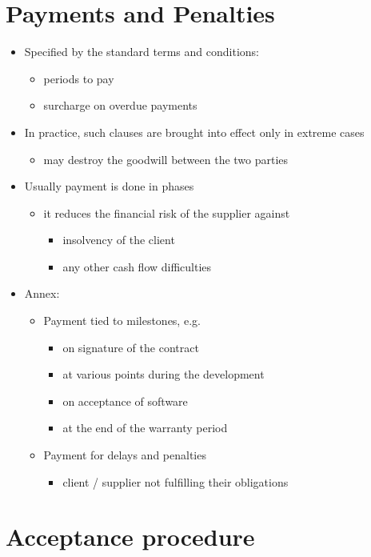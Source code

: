 \documentclass{article}
\begin{document}
\section{Payments and Penalties}
\begin{itemize}
\item Specified by the standard terms and conditions:
\begin{itemize}
\item periods to pay
\item surcharge on overdue payments
\end{itemize}
\item In practice, such clauses are brought into effect only in extreme cases
\begin{itemize}
\item may destroy the goodwill between the two parties
\end{itemize}
\item Usually payment is done in phases
\begin{itemize}
\item it reduces the financial risk of the supplier against
\begin{itemize}
\item insolvency of the client
\item any other cash flow difficulties
\end{itemize}
\end{itemize}
\item Annex:
\begin{itemize}
\item Payment tied to milestones, e.g.
\begin{itemize}
\item on signature of the contract
\item at various points during the development
\item on acceptance of software
\item at the end of the warranty period
\end{itemize}
\item Payment for delays and penalties
\begin{itemize}
\item client / supplier not fulfilling their obligations
\end{itemize}
\end{itemize}
\end{itemize}



\section{Acceptance procedure}
\end{document}
